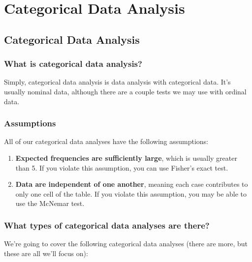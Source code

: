 \documentclass[
]{book}
\begin{document}
\hypertarget{part-categorical-data-analysis}{%
\part{Categorical Data Analysis}\label{part-categorical-data-analysis}}

\hypertarget{categorical-data-analysis}{%
\chapter{Categorical Data Analysis}\label{categorical-data-analysis}}

\hypertarget{what-is-categorical-data-analysis}{%
\section{What is categorical data analysis?}\label{what-is-categorical-data-analysis}}

Simply, categorical data analysis is data analysis with categorical data. It's usually nominal data, although there are a couple tests we may use with ordinal data.

\hypertarget{assumptions}{%
\section{Assumptions}\label{assumptions}}

All of our categorical data analyses have the following assumptions:

\begin{enumerate}
\def\labelenumi{\arabic{enumi}.}
\item
  \textbf{Expected frequencies are sufficiently large}, which is usually greater than 5. If you violate this assumption, you can use Fisher's exact test.
\item
  \textbf{Data are independent of one another}, meaning each case contributes to only one cell of the table. If you violate this assumption, you may be able to use the McNemar test.
\end{enumerate}

\hypertarget{what-types-of-categorical-data-analyses-are-there}{%
\section{What types of categorical data analyses are there?}\label{what-types-of-categorical-data-analyses-are-there}}

We're going to cover the following categorical data analyses (there are more, but these are all we'll focus on):
\end{document}
